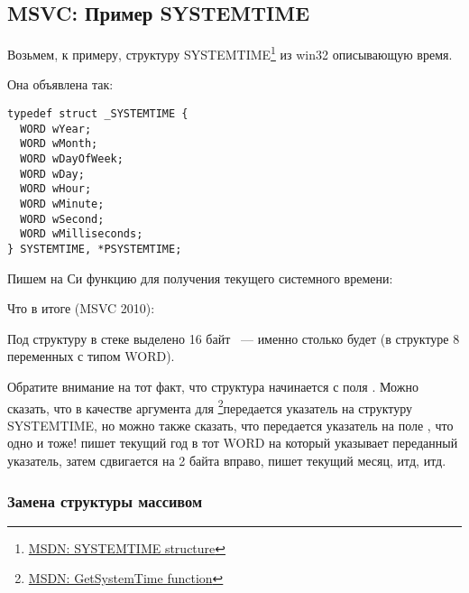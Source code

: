 \subsection{MSVC: Пример SYSTEMTIME}
\label{sec:SYSTEMTIME}

\newcommand{\FNSYSTEMTIME}{\footnote{\href{http://msdn.microsoft.com/en-us/library/ms724950(VS.85).aspx}{MSDN: SYSTEMTIME structure}}}

Возьмем, к примеру, структуру SYSTEMTIME\FNSYSTEMTIME{} из win32 описывающую время.

Она объявлена так:

\begin{lstlisting}[caption=WinBase.h,style=customc]
typedef struct _SYSTEMTIME {
  WORD wYear;
  WORD wMonth;
  WORD wDayOfWeek;
  WORD wDay;
  WORD wHour;
  WORD wMinute;
  WORD wSecond;
  WORD wMilliseconds;
} SYSTEMTIME, *PSYSTEMTIME;
\end{lstlisting}

Пишем на Си функцию для получения текущего системного времени:



Что в итоге (MSVC 2010):



Под структуру в стеке выделено 16 байт ~--- именно столько будет 
(в структуре 8 переменных с типом WORD).

\newcommand{\FNMSDNGST}{\footnote{\href{http://msdn.microsoft.com/en-us/library/ms724390(VS.85).aspx}{MSDN: GetSystemTime function}}}

Обратите внимание на тот факт, что структура начинается с поля . 
Можно сказать, что в качестве аргумента для \FNMSDNGST передается указатель на структуру 
SYSTEMTIME, но можно также сказать, что передается указатель на поле , 
что одно и тоже! 
 пишет текущий год в тот WORD на который указывает переданный указатель, 
затем сдвигается на 2 байта вправо, пишет текущий месяц, итд, итд.



\subsubsection{Замена структуры массивом}

